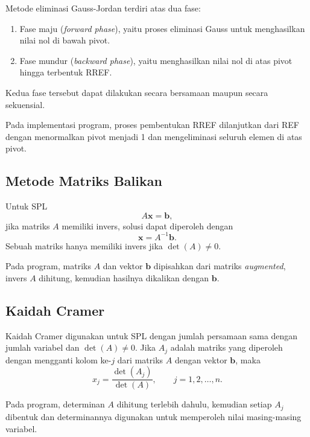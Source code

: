 \documentclass[12pt,a4paper]{report}
\begin{document}
Metode eliminasi Gauss-Jordan terdiri atas dua fase:
\begin{enumerate}
    \item Fase maju (\textit{forward phase}), yaitu proses eliminasi Gauss
    untuk menghasilkan nilai nol di bawah pivot.
    \item Fase mundur (\textit{backward phase}), yaitu menghasilkan nilai
    nol di atas pivot hingga terbentuk RREF.
\end{enumerate}
Kedua fase tersebut dapat dilakukan secara bersamaan maupun secara
sekuensial. \cite{pakrin-spl2}

Pada implementasi program, proses pembentukan RREF dilanjutkan dari REF
dengan menormalkan pivot menjadi 1 dan mengeliminasi seluruh elemen di atas
pivot.

\subsection{Metode Matriks Balikan}

Untuk SPL
\begin{equation*}
A\mathbf{x}=\mathbf{b},
\end{equation*}
jika matriks $A$ memiliki invers, solusi dapat diperoleh dengan
\begin{equation*}
\mathbf{x}=A^{-1}\mathbf{b}.
\end{equation*}
Sebuah matriks hanya memiliki invers jika $\det(A)\neq 0$. \cite{tubes}

Pada program, matriks $A$ dan vektor $\mathbf{b}$ dipisahkan dari matriks \textit{augmented}, invers $A$ dihitung, kemudian hasilnya dikalikan dengan $\mathbf{b}$.

\subsection{Kaidah Cramer}

Kaidah Cramer digunakan untuk SPL dengan jumlah persamaan sama dengan jumlah variabel dan $\det(A)\neq 0$. Jika $A_j$ adalah matriks yang diperoleh dengan mengganti kolom ke-$j$ dari matriks $A$ dengan vektor $\mathbf{b}$, maka
\begin{equation*}
x_j=\frac{\det(A_j)}{\det(A)},\qquad j=1,2,\ldots,n.
\end{equation*}
\cite{tubes}

Pada program, determinan $A$ dihitung terlebih dahulu, kemudian setiap $A_j$ dibentuk dan determinannya digunakan untuk memperoleh nilai masing-masing variabel.
\end{document}
